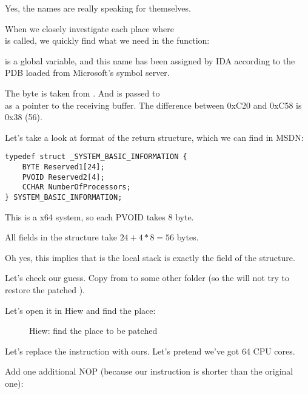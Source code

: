 Yes, the names are really speaking for themselves.

When we closely investigate each place where\\
 is called,
we quickly find what we need in the  function:



 is a global variable, and this name has been assigned by 
IDA according to the \gls{PDB} loaded from Microsoft's symbol server.

The byte is taken from . 
And  is passed to\\
as a pointer to the receiving buffer.
The difference between 0xC20 and 0xC58 is 0x38 (56).

Let's take a look at format of the return structure, which we can find in MSDN:

\begin{lstlisting}
typedef struct _SYSTEM_BASIC_INFORMATION {
    BYTE Reserved1[24];
    PVOID Reserved2[4];
    CCHAR NumberOfProcessors;
} SYSTEM_BASIC_INFORMATION;
\end{lstlisting}

This is a x64 system, so each PVOID takes 8 byte.

All  fields in the structure take $24+4*8=56$ bytes.

Oh yes, this implies that  is the local stack is exactly the
 field of the  structure.

Let's check our guess.
Copy  from  
to some other folder 
(so the  
will not try to restore the patched ).

Let's open it in Hiew and find the place:

\begin{figure}[H]
\centering
{}
\caption{Hiew: find the place to be patched}
\end{figure}

Let's replace the  instruction with ours.
Let's pretend we've got 64 CPU cores.

Add one additional \ac{NOP} (because our instruction is shorter than the original one):

